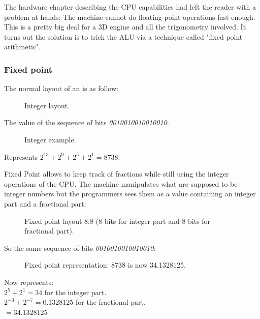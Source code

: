 The hardware chapter describing the CPU capabilities had left the reader with a problem at hands: The machine cannot do floating point operations fast enough. This is a pretty big deal for a 3D engine and all the trigonometry involved. It turns out the solution is to trick the ALU via a technique called "fixed point arithmetic".







\subsubsection{Fixed point}
The normal layout of an  is as follow:
\begin{figure}[H]
\centering
 
 \caption{Integer layout.} \label{fig:int_layout}
 \end{figure}
The value of the sequence of bits \emph{0010010010010010}:
\begin{figure}[H]
\centering

 \caption{Integer example.} \label{fig:mips}
 \end{figure}

Represents $ 2^{13} + 2^9 + 2^5 + 2^1 =  8738 $.\\
 \par

Fixed Point allows to keep track of fractions while still using the integer operations of the CPU. The machine manipulates what are supposed to be integer numbers but the programmers sees them as a value containing an integer part and a fractional part:\\
\par
\begin{figure}[H]
 \centering
  
 \caption{Fixed point layout 8:8 (8-bits for integer part and 8 bits for fractional part).} \label{fig:mips}
\end{figure}

So the same sequence of bits \emph{0010010010010010}:
\begin{figure}[H]
 \centering
   
  \caption{Fixed point representation: 8738 is now 34.1328125.} \label{fig:mips}
\end{figure} 

Now represents:\\

$ 2^5 + 2^1 = 34 $ for the integer part.\\
$ 2^{-3}+2^{-7} = 0.1328125 $ for the fractional part.\\
$ = 34.1328125$\\

